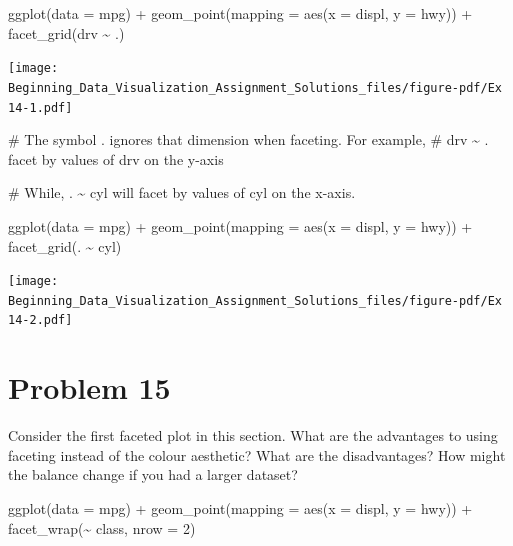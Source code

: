 \documentclass[
  letterpaper,
  DIV=11,
  numbers=noendperiod]{scrreprt}
\newenvironment{Shaded}{\begin{snugshade}}{\end{snugshade}}
\newcommand{\AttributeTok}[1]{\textcolor[rgb]{0.40,0.45,0.13}{#1}}
\newcommand{\CommentTok}[1]{\textcolor[rgb]{0.37,0.37,0.37}{#1}}
\newcommand{\DecValTok}[1]{\textcolor[rgb]{0.68,0.00,0.00}{#1}}
\newcommand{\FunctionTok}[1]{\textcolor[rgb]{0.28,0.35,0.67}{#1}}
\newcommand{\NormalTok}[1]{\textcolor[rgb]{0.00,0.23,0.31}{#1}}
\newcommand{\SpecialCharTok}[1]{\textcolor[rgb]{0.37,0.37,0.37}{#1}}
\begin{document}
\begin{Shaded}
\begin{Highlighting}[]
\FunctionTok{ggplot}\NormalTok{(}\AttributeTok{data =}\NormalTok{ mpg) }\SpecialCharTok{+} 
  \FunctionTok{geom\_point}\NormalTok{(}\AttributeTok{mapping =} \FunctionTok{aes}\NormalTok{(}\AttributeTok{x =}\NormalTok{ displ, }\AttributeTok{y =}\NormalTok{ hwy)) }\SpecialCharTok{+}
  \FunctionTok{facet\_grid}\NormalTok{(drv }\SpecialCharTok{\textasciitilde{}}\NormalTok{ .)}
\end{Highlighting}
\end{Shaded}

\texttt{[image: Beginning\_Data\_Visualization\_Assignment\_Solutions\_files/figure-pdf/Ex 14-1.pdf]}

\begin{Shaded}
\begin{Highlighting}[]
\CommentTok{\# The symbol . ignores that dimension when faceting. For example, }
\CommentTok{\# drv \textasciitilde{} . facet by values of drv on the y{-}axis}

\CommentTok{\# While, . \textasciitilde{} cyl will facet by values of cyl on the x{-}axis.}

\FunctionTok{ggplot}\NormalTok{(}\AttributeTok{data =}\NormalTok{ mpg) }\SpecialCharTok{+} 
  \FunctionTok{geom\_point}\NormalTok{(}\AttributeTok{mapping =} \FunctionTok{aes}\NormalTok{(}\AttributeTok{x =}\NormalTok{ displ, }\AttributeTok{y =}\NormalTok{ hwy)) }\SpecialCharTok{+}
  \FunctionTok{facet\_grid}\NormalTok{(. }\SpecialCharTok{\textasciitilde{}}\NormalTok{ cyl)}
\end{Highlighting}
\end{Shaded}

\texttt{[image: Beginning\_Data\_Visualization\_Assignment\_Solutions\_files/figure-pdf/Ex 14-2.pdf]}

\section*{Problem 15}\label{problem-15-3}


Consider the first faceted plot in this section. What are the advantages
to using faceting instead of the colour aesthetic? What are the
disadvantages? How might the balance change if you had a larger dataset?

\begin{Shaded}
\begin{Highlighting}[]
\FunctionTok{ggplot}\NormalTok{(}\AttributeTok{data =}\NormalTok{ mpg) }\SpecialCharTok{+} 
  \FunctionTok{geom\_point}\NormalTok{(}\AttributeTok{mapping =} \FunctionTok{aes}\NormalTok{(}\AttributeTok{x =}\NormalTok{ displ, }\AttributeTok{y =}\NormalTok{ hwy)) }\SpecialCharTok{+} 
  \FunctionTok{facet\_wrap}\NormalTok{(}\SpecialCharTok{\textasciitilde{}}\NormalTok{ class, }\AttributeTok{nrow =} \DecValTok{2}\NormalTok{)}
\end{Highlighting}
\end{Shaded}
\end{document}

